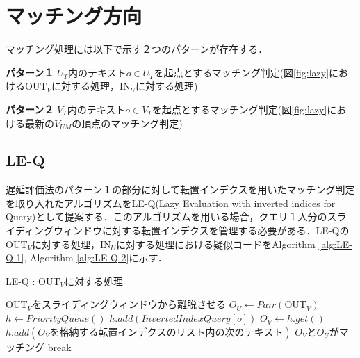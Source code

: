 \section{マッチング方向}
マッチング処理には以下で示す２つのパターンが存在する．
\begin{description}
    \item \textbf{パターン１} $U_T$内のテキスト$o \in U_T$を起点とするマッチング判定(図\ref{fig:lazy}における$\mbox{OUT}_V$に対する処理，$\mbox{IN}_U$に対する処理)
    \item \textbf{パターン２} $V_T$内のテキスト$o \in V_T$を起点とするマッチング判定(図\ref{fig:lazy}における最新の$V_{UM}$の頂点のマッチング判定)
\end{description}

\subsection{LE-Q}
遅延評価法のパターン１の部分に対して転置インデクスを用いたマッチング判定を取り入れたアルゴリズムをLE-Q(Lazy Evaluation with inverted indices for Query)として提案する．このアルゴリズムを用いる場合，クエリ１人分のスライディングウィンドウに対する転置インデクスを管理する必要がある．LE-Qの$\mbox{OUT}_V$に対する処理，$\mbox{IN}_U$に対する処理における疑似コードをAlgorithm \ref{alg:LE-Q-1}, Algorithm \ref{alg:LE-Q-2}に示す．

\begin{algorithm}[H]
    \caption{LE-Q : $\mbox{OUT}_V$に対する処理}
    \label{alg:LE-Q-1}
    \begin{algorithmic}[1]
    \State $\mbox{OUT}_V$をスライディングウィンドウから離脱させる
        \State $O_U\leftarrow Pair(\mbox{OUT}_V)$
        \State $h \leftarrow PriorityQueue()$
            \State $h.add(InvertedIndexQuery[o])$
        \EndFor
            \State $O_V \leftarrow h.get()$
            \State $h.add(O_Vを格納する転置インデクスのリスト内の次のテキスト)$
                    \State $O_V$と$O_U$がマッチング
                    \State break
                \EndIf
            \EndIf
        \EndWhile
    \EndIf
    \end{algorithmic}
\end{algorithm}

